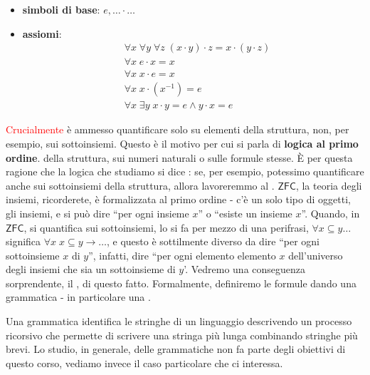 \begin{example}
    \emph{}\vspace{-0.7cm}
    \begin{itemize}
        \item \textbf{simboli di base}: $e,\ldots\cdot\ldots$
        \item \textbf{assiomi}:
        \begin{align*}
            &\forall x\; \forall y\; \forall z \; (x \cdot y) \cdot z = x \cdot (y \cdot z) \\
            &\forall x\; e \cdot x = x \\
            &\forall x\; x \cdot e = x \\
            &\forall x\; x \cdot (x^{-1}) = e \\
            &\forall x\; \exists y\; x \cdot y = e \land y \cdot x = e
        \end{align*}
    \end{itemize}
\end{example}

\textcolor{red}{Crucialmente} è ammesso quantificare solo su elementi della struttura, non, per esempio, sui sottoinsiemi. Questo è il motivo per cui si parla di \textbf{logica al primo ordine}.
della struttura, sui numeri naturali o sulle formule stesse. È per questa ragione che la logica che studiamo si dice : se, per esempio, potessimo quantificare anche sui sottoinsiemi
della struttura, allora lavoreremmo al . $\mathsf{ZFC}$, la teoria degli insiemi, ricorderete, è formalizzata al primo ordine - c'è un solo tipo di oggetti, gli insiemi, e si può dire ``per ogni insieme $x$''
o ``esiste un insieme $x$''. Quando, in $\mathsf{ZFC}$, si quantifica sui sottoinsiemi, lo si fa per mezzo di una perifrasi, $\forall x \subseteq y \ldots$ significa $\forall x \; x \subseteq y \to \ldots$, e questo è sottilmente diverso
da dire ``per ogni sottoinsieme $x$ di $y$'', infatti, dire ``per ogni elemento elemento $x$ dell'universo degli insiemi che sia un sottoinsieme di $y$'. Vedremo una conseguenza sorprendente, il , di questo fatto. 
Formalmente, definiremo le formule dando  una grammatica - in particolare una .

\medskip

Una grammatica identifica le stringhe di un linguaggio descrivendo un processo ricorsivo che permette di scrivere una stringa più lunga combinando stringhe più brevi.
Lo studio, in generale, delle grammatiche non fa parte degli obiettivi di questo corso, vediamo invece il caso particolare che ci interessa.

